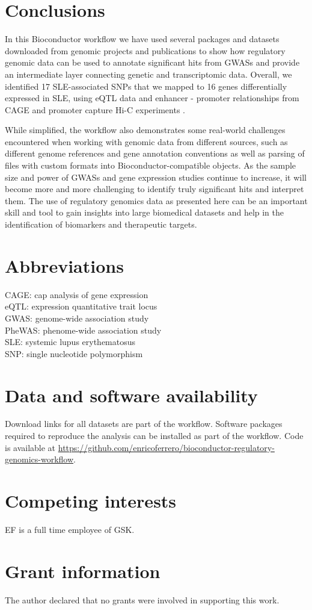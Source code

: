\documentclass[9pt,a4paper,]{extarticle}
\begin{document}
\section{Conclusions}\label{conclusions}

In this Bioconductor workflow we have used several packages and datasets downloaded from genomic projects and publications to show how regulatory genomic data can be used to annotate significant hits from GWASs and provide an intermediate layer connecting genetic and transcriptomic data.
Overall, we identified 17 SLE-associated SNPs that we mapped to 16 genes differentially expressed in SLE, using eQTL data \citep{GTEx2017a} and enhancer - promoter relationships from CAGE \citep{Fantom2014} and promoter capture Hi-C experiments \citep{Javierre2016}.

While simplified, the workflow also demonstrates some real-world challenges encountered when working with genomic data from different sources, such as different genome references and gene annotation conventions as well as parsing of files with custom formats into Bioconductor-compatible objects.
As the sample size and power of GWASs and gene expression studies continue to increase, it will become more and more challenging to identify truly significant hits and interpret them.
The use of regulatory genomics data as presented here can be an important skill and tool to gain insights into large biomedical datasets and help in the identification of biomarkers and therapeutic targets.

\section{Abbreviations}\label{abbreviations}

CAGE: cap analysis of gene expression\\
eQTL: expression quantitative trait locus\\
GWAS: genome-wide association study\\
PheWAS: phenome-wide association study\\
SLE: systemic lupus erythematosus\\
SNP: single nucleotide polymorphism

\section{Data and software availability}\label{data-and-software-availability}

Download links for all datasets are part of the workflow.
Software packages required to reproduce the analysis can be installed as part of the workflow.
Code is available at \url{https://github.com/enricoferrero/bioconductor-regulatory-genomics-workflow}.

\section{Competing interests}\label{competing-interests}

EF is a full time employee of GSK.

\section{Grant information}\label{grant-information}

The author declared that no grants were involved in supporting this work.

\renewcommand\refname{References}
{\small}
\end{document}
